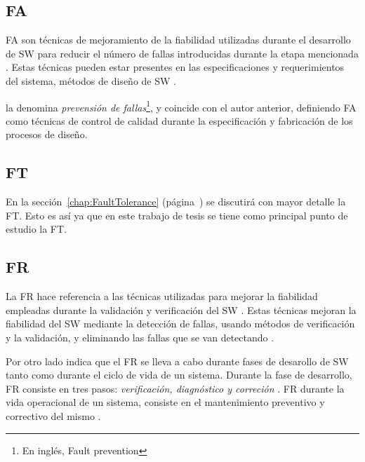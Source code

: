 \subsection{\acl{FA}}
\ac{FA} son técnicas de mejoramiento de la fiabilidad utilizadas durante el desarrollo de \ac{SW} 
para reducir el número de fallas introducidas durante la etapa mencionada \citep{Pullum01}. Estas 
técnicas pueden estar presentes en las especificaciones y requerimientos del sistema, métodos de 
diseño de \ac{SW} \citep{Pullum01}.

\cite{FTDesign} la denomina \textit{prevensión de fallas}\footnote{En inglés, Fault prevention}, y 
coincide con el autor anterior, definiendo \ac{FA} como técnicas de control de calidad durante la 
especificación y fabricación de los procesos de diseño. 


\subsection{\acl{FT}}
En la sección~\ref{chap:FaultTolerance} (página~\pageref{chap:FaultTolerance}) se discutirá con 
mayor detalle la \ac{FT}. Esto es así ya que en este trabajo de tesis se tiene como principal punto 
de estudio la \acl{FT}.

\subsection{\acl{FR}}
La \ac{FR} hace referencia a las técnicas utilizadas para mejorar la fiabilidad empleadas durante 
la validación y verificación del \ac{SW} \citep{Pullum01}. Estas técnicas mejoran la fiabilidad del 
\ac{SW} mediante la detección de fallas, usando métodos de verificación y la validación, y 
eliminando las fallas que se van detectando \citep{Pullum01}. 

Por otro lado \cite{FTDesign} indica que el \ac{FR} se lleva a cabo durante fases de desarollo de 
\ac{SW} tanto como durante el ciclo de vida de un sistema. Durante la fase de desarrollo, \ac{FR} 
consiste en tres pasos: \textit{verificación, diagnóstico y correción} \citep{FTDesign}. \ac{FR} 
durante la vida operacional de un sistema, consiste en el mantenimiento preventivo y correctivo del 
mismo \citep{FTDesign}.

